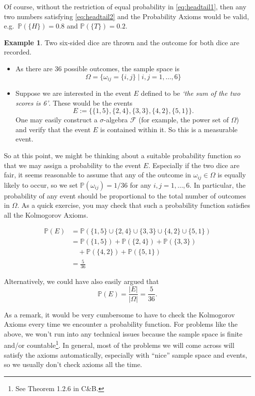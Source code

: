 \documentclass[
]{book}
\newcommand{\bbP}{\mathbb{P}}
\newcommand{\cF}{{\mathcal F}}
\theoremstyle{definition}
\theoremstyle{definition}
\newtheorem{example}{Example}[chapter]
\theoremstyle{definition}
\theoremstyle{definition}
\theoremstyle{remark}
\begin{document}
Of course, without the restriction of equal probability in \eqref{eq:headtail1}, then any two numbers satisfying \eqref{eq:headtail2} and the Probability Axioms would be valid, e.g.~\(\bbP(\{H\})= 0.8\) and \(\bbP(\{T\}) = 0.2.\)

\begin{example}
Two six-sided dice are thrown and the outcome for both dice are recorded.

\begin{itemize}
\item
  As there are 36 possible outcomes, the sample space is
  \[
  \Omega = \big\{ \omega_{ij}=\{i,j\} \mid i,j =1,\dots,6 \big\}
  \]
\item
  Suppose we are interested in the event \(E\) defined to be \emph{`the sum of the two scores is 6'}. These would be the events
  \[
  E := \big\{ \{1,5\}, \{2,4\}, \{3,3\}, \{4,2\}, \{5,1\} \big\}.
  \]
  One may easily construct a \(\sigma\)-algebra \(\cF\) (for example, the power set of \(\Omega\)) and verify that the event \(E\) is contained within it. So this is a measurable event.
\end{itemize}

So at this point, we might be thinking about a suitable probability function so that we may assign a probability to the event \(E\).
Especially if the two dice are fair, it seems reasonable to assume that any of the outcome in \(\omega_{ij}\in\Omega\) is equally likely to occur, so we set \(\bbP(\omega_{ij}) = 1/36\) for any \(i,j =1,\dots,6\).
In particular, the probability of any event should be proportional to the total number of outcomes in \(\Omega\).
As a quick exercise, you may check that such a probability function satisfies all the Kolmogorov Axioms.

\begin{align*}
\bbP(E) &= 
\bbP\left( \{1,5\} \cup \{2,4\} \cup \{3,3\} \cup \{4,2\} \cup \{5,1\} \right) \\
&= \bbP( \{1,5\}) + \bbP(\{2,4\}) + \bbP(\{3,3\}) \\
& \hspace{1em} + \bbP(\{4,2\}) + \bbP(\{5,1\}) \\
&= \frac{5}{36}
\end{align*}

Alternatively, we could have also easily argued that
\[
\bbP(E) = \frac{|E|}{|\Omega|} = \frac{5}{36}.
\]
\end{example}

As a remark, it would be very cumbersome to have to check the Kolmogorov Axioms every time we encounter a probability function.
For problems like the above, we won't run into any technical issues because the sample space is finite and/or countable\footnote{See Theorem 1.2.6 in C\&B.}.
In general, most of the problems we will come across will satisfy the axioms automatically, especially with ``nice'' sample space and events, so we usually don't check axioms all the time.
\end{document}

